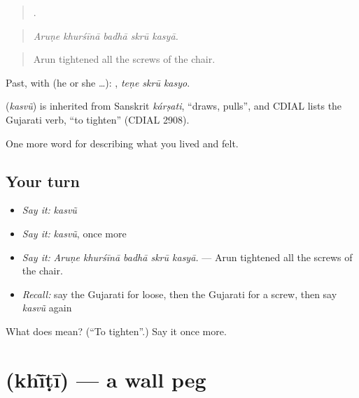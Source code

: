 \begin{quote}
    .
\end{quote}

\begin{quote}
\emph{Aruṇe khurśīnā badhā skrū kasyā.}
\end{quote}

\begin{quote}
Arun tightened all the screws of the chair.
\end{quote}

Past, with  (he or she …):   , \emph{teṇe skrū kasyo}.

\begin{cousinweb}
\textbf{} (\emph{kasvũ}) is inherited from Sanskrit \emph{kárṣati}, \textquotedblleft{}draws, pulls\textquotedblright{}, and CDIAL lists the Gujarati verb, \textquotedblleft{}to tighten\textquotedblright{} (CDIAL 2908).
\end{cousinweb}

\begin{grammarlens}[title={What you've built}]
One more word for describing what you lived and felt.
\end{grammarlens}

\subsection*{Your turn}
\begin{itemize}
\raggedright
  \item \emph{Say it:} \emph{kasvũ}
  \item \emph{Say it:} \emph{kasvũ}, once more
  \item \emph{Say it:} \emph{Aruṇe khurśīnā badhā skrū kasyā.} — Arun tightened all the screws of the chair.
  \item \emph{Recall:} say the Gujarati for loose, then the Gujarati for a screw, then say \emph{kasvũ} again
\end{itemize}

\begin{tcolorbox}[breakable,colback=teal!4,colframe=teal!35!black,title={Before you move on}]
What does  mean? (\textquotedblleft{}To tighten\textquotedblright{}.) Say it once more.
\end{tcolorbox}
\section[\texorpdfstring{\gu{ખીંટી} (khī̃ṭī)}{ખીંટી (khī̃ṭī)}]{ (khī̃ṭī) — a wall peg}

